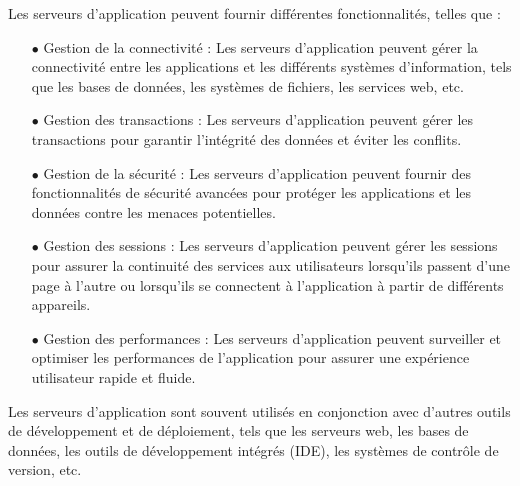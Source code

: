 Les serveurs d'application peuvent fournir différentes fonctionnalités, telles que :
\begin{enumerate}
	\item[$\bullet$]Gestion de la connectivité : Les serveurs d'application peuvent gérer la connectivité entre les applications et les différents systèmes d'information, tels que les bases de données, les systèmes de fichiers, les services web, etc.
	 
	\item[$\bullet$] Gestion des transactions : Les serveurs d'application peuvent gérer les transactions pour garantir l'intégrité des données et éviter les conflits.
	 
	\item[$\bullet$] Gestion de la sécurité : Les serveurs d'application peuvent fournir des fonctionnalités de sécurité avancées pour protéger les applications et les données contre les menaces potentielles.
	 
	 \item[$\bullet$] Gestion des sessions : Les serveurs d'application peuvent gérer les sessions pour assurer la continuité des services aux utilisateurs lorsqu'ils passent d'une page à l'autre ou lorsqu'ils se connectent à l'application à partir de différents appareils.
	 
	\item[$\bullet$] Gestion des performances : Les serveurs d'application peuvent surveiller et optimiser les performances de l'application pour assurer une expérience utilisateur rapide et fluide.
	 
\end{enumerate}
Les serveurs d'application sont souvent utilisés en conjonction avec d'autres outils de développement et de déploiement, tels que les serveurs web, les bases de données, les outils de développement intégrés (IDE), les systèmes de contrôle de version, etc.\\
